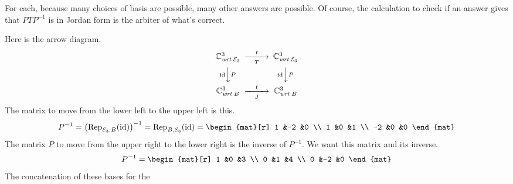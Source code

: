 \begin{exercises}
    \begin{exparts*}
      \partsitem {}
      \partsitem {}
      \partsitem {}
    \end{exparts*}
    \begin{answer}
      For each, because many choices of basis are possible, many other 
      answers are possible.
      Of course, the calculation to check if an answer gives that $PTP^{-1}$
      is in Jordan form is the arbiter of what's correct.
      \begin{exparts}
        \partsitem Here is the arrow diagram.
          \begin{equation*}
            \begin{CD}
              \C^3_{\wrt{\stdbasis_3}}      @>t>T>    \C^3_{\wrt{\stdbasis_3}}   \\
                @V\scriptstyle\identity V\scriptstyle PV  
                                    @V\scriptstyle\identity V\scriptstyle PV \\
              \C^3_{\wrt{B}}                 @>t>J>         \C^3_{\wrt{B}}
            \end{CD}
          \end{equation*}
          The matrix to move from the lower left to the upper left is this. 
          \begin{equation*}
            P^{-1}=\bigl(\rep{\identity}{\stdbasis_3,B}\bigr)^{-1}
                  =\rep{\identity}{B,\stdbasis_3}   
                  =\begin{mat}[r]
                     1  &-2   &0 \\
                     1  &0   &1 \\
                    -2  &0   &0
                   \end{mat}
          \end{equation*}
          The matrix $P$ to move from the upper right to the lower
          right is the inverse of $P^{-1}$.
        \partsitem We want this matrix and its inverse.
          \begin{equation*}
            P^{-1}=
            \begin{mat}[r]
              1  &0  &3  \\
              0  &1  &4  \\
              0  &-2 &0
            \end{mat}
          \end{equation*}
        \partsitem The concatenation of these bases for the 

\end{exparts}
\end{answer}
\end{exercises}
